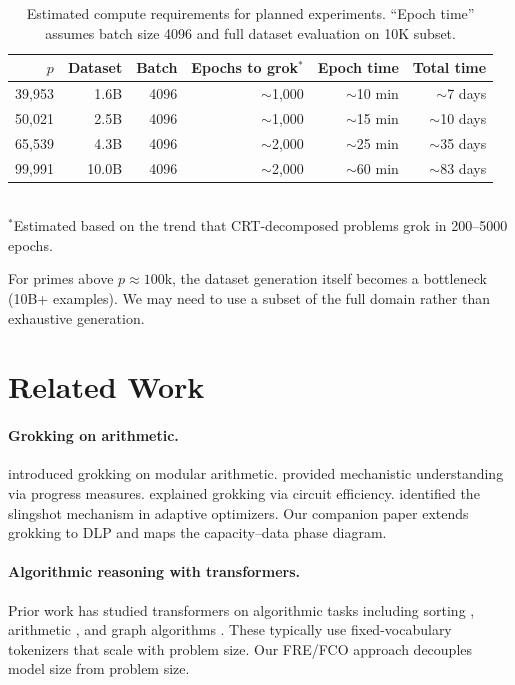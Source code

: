 \documentclass[11pt]{article}
\begin{document}
\begin{table}[t]
\centering
\caption{Estimated compute requirements for planned experiments. ``Epoch time'' assumes batch size 4096 and full dataset evaluation on 10K subset.}
\label{tab:resources}
\begin{tabular}{rrrrrr}
\toprule
$p$ & Dataset & Batch & Epochs to grok$^*$ & Epoch time & Total time \\
\midrule
39,953 & 1.6B & 4096 & $\sim$1,000 & $\sim$10 min & $\sim$7 days \\
50,021 & 2.5B & 4096 & $\sim$1,000 & $\sim$15 min & $\sim$10 days \\
65,539 & 4.3B & 4096 & $\sim$2,000 & $\sim$25 min & $\sim$35 days \\
99,991 & 10.0B & 4096 & $\sim$2,000 & $\sim$60 min & $\sim$83 days \\
\bottomrule
\end{tabular}
\\[4pt]
\footnotesize{$^*$Estimated based on the trend that CRT-decomposed problems grok in 200--5000 epochs.}
\end{table}

For primes above $p \approx 100$k, the dataset generation itself becomes a bottleneck (10B+ examples). We may need to use a subset of the full domain rather than exhaustive generation.



\section{Related Work}
\label{sec:related}

\paragraph{Grokking on arithmetic.} \citet{power2022grokking} introduced grokking on modular arithmetic. \citet{nanda2023progress} provided mechanistic understanding via progress measures. \citet{varma2023explaining} explained grokking via circuit efficiency. \citet{thilak2022slingshot} identified the slingshot mechanism in adaptive optimizers. Our companion paper \citep{svensson2026scaling} extends grokking to DLP and maps the capacity--data phase diagram.

\paragraph{Algorithmic reasoning with transformers.} Prior work has studied transformers on algorithmic tasks including sorting \citep{graves2014neural}, arithmetic \citep{saxton2019analysing}, and graph algorithms \citep{velivckovic2022clrs}. These typically use fixed-vocabulary tokenizers that scale with problem size. Our FRE/FCO approach decouples model size from problem size.
\end{document}
